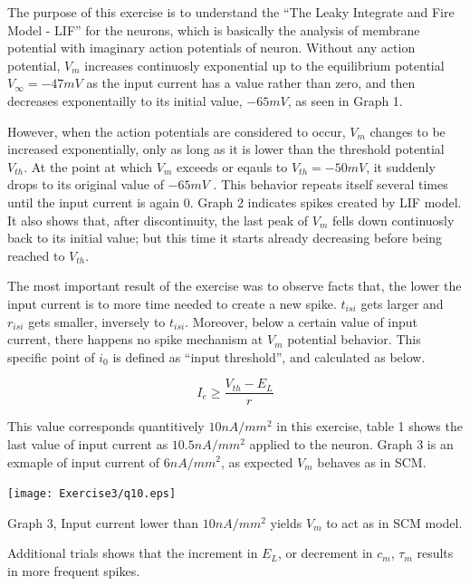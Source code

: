 \documentclass{article}
\begin{document}
The purpose of this exercise is to understand the ``The Leaky Integrate and Fire Model - LIF'' for the neurons, which is basically the analysis of membrane potential with imaginary action potentials of neuron. Without any action potential, $V_{m}$ increases continuosly exponential up to the equilibrium potential $V_{\infty}=-47 mV$ as the input current has a value rather than zero, and then decreases exponentailly to its initial value, $-65 mV$, as seen in Graph 1. 

However, when the action potentials are considered to occur, $V_{m}$ changes to be increased exponentially, only as long as it is lower than the threshold potential $V_{th}$. At the point at which $V_{m}$ exceeds or eqauls to $V_{th}=-50 mV$, it suddenly drops to its original value of $-65 mV$ . This behavior repeats itself several times until the input current is again 0. Graph 2 indicates spikes created by LIF model. It also shows that, after discontinuity, the last peak  of $V_{m}$ fells down continuosly back to its initial value; but this time it starts already decreasing before being reached to $V_{th}$.

The most important result of the exercise was to observe facts that, the lower the input current is to more time needed to create a new spike. $t_{isi}$ gets larger and $r_{isi}$ gets smaller, inversely to $t_{isi}$. Moreover, below a certain value of input current, there happens no spike mechanism at $V_{m}$ potential behavior. This specific point of $i_{0}$ is defined as ``input threshold'', and calculated as below. 

\begin{equation}
I_{e} \geq  \dfrac{V_{th}-E_{L}}{r}
\end{equation}

This value corresponds quantitively $10 nA/mm^{2}$ in this exercise, table 1 shows the last value of input current as $10.5 nA/mm^{2}$ applied to the neuron. Graph 3 is an exmaple of input current of $6 nA/mm^{2}$, as expected $V_{m}$ behaves as in SCM. 

\begin{center}

\texttt{[image: Exercise3/q10.eps]}

Graph 3, Input current lower than $10 nA/mm^{2}$ yields $V_{m}$ to act as in SCM model.
\end{center}
Additional trials shows that the increment in $E_{L}$, or decrement in $c_{m}$, $\tau_{m}$ results in more frequent spikes.
\end{document}

